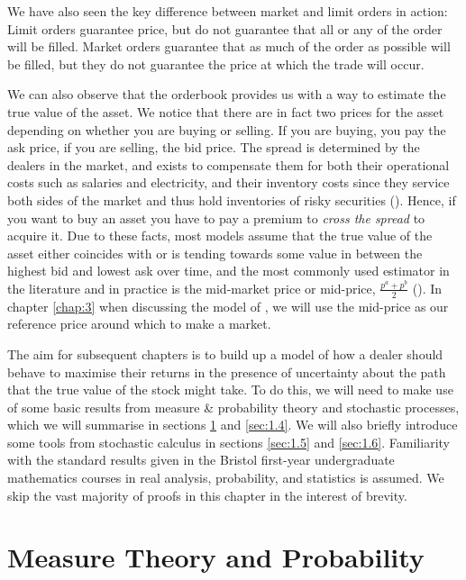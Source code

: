 We have also seen the key difference between market and limit orders in action: Limit 
orders guarantee price, but do not guarantee that all or any of the order will be 
filled. Market orders guarantee that as much of the order as possible will be filled, 
but they do not guarantee the price at which the trade will occur.

We can also observe that the orderbook provides us with a way to estimate the true value 
of the asset. We notice that there are in fact two prices for the asset depending on whether 
you are buying or selling. If you are buying, you pay the ask price, if you are selling,
the bid price. The spread is determined by the dealers in the market, and exists to compensate 
them for both their operational costs such as salaries and electricity, and their inventory 
costs since they service both sides of the market and thus hold inventories of risky
securities (\cite{trading}). Hence, if you want 
to buy an asset you have to pay a premium to \emph{cross the spread} to acquire 
it. Due to these facts, most models assume that the true value of the asset either 
coincides with or is tending towards some value in between the highest bid and lowest ask
over time, and the most commonly used estimator in the literature and in practice is 
the mid-market price or mid-price, $\frac{p^a+p^b}{2}$ (\cite{trading}). In chapter \ref{chap:3}
when discussing the model of \textcite{AS2008}, we will use the mid-price as our reference 
price around which to make a market.

The aim for subsequent chapters is to build up a model of how a dealer should 
behave to maximise their returns in the presence of uncertainty about the path that 
the true value of the stock might take. To do this, we 
will need to make use of some basic results from measure \& probability theory and 
stochastic processes, which we will summarise in sections \ref{sec:1.3} and \ref{sec:1.4}. 
We will also briefly introduce some tools from stochastic calculus in sections \ref{sec:1.5} 
and \ref{sec:1.6}. Familiarity with the standard results given in the Bristol 
first-year undergraduate mathematics courses in real analysis, probability, and statistics 
is assumed. We skip the vast majority of proofs in this chapter in the interest of 
brevity.

\section{Measure Theory and Probability}\label{sec:1.3}

